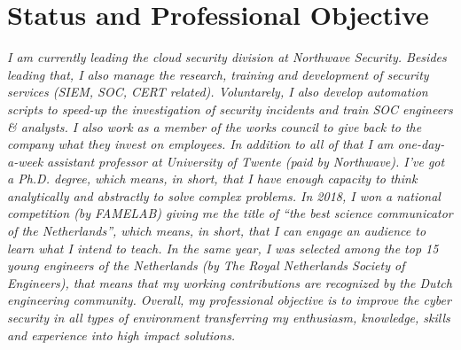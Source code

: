 \documentclass[print]{styles/friggeri-cv-mac} %
\begin{document}
\section{Status and Professional Objective}\vspace{-10pt}
\noindent\setlength\parindent{12pt}\textit{
	I am currently leading the cloud security division at Northwave Security. Besides leading that, I also manage the research, training and development of security services (SIEM, SOC, CERT related). Voluntarely, I also develop automation scripts to speed-up the investigation of security incidents and train SOC engineers \& analysts. I also work as a member of the works council to give back to the company what they invest on employees.
	In addition to all of that I am one-day-a-week assistant professor at University of Twente (paid by Northwave). 
	I've got a Ph.D. degree, which means, in short, that I have enough capacity to think analytically and abstractly to solve complex problems. 
	In 2018, I won a national competition (by FAMELAB) giving me the title of ``the best science communicator of 
	the Netherlands'', which means, in short, that I can engage an audience to learn what I intend to teach.
	In the same year, I was selected among the top 15 young engineers of the Netherlands (by The Royal Netherlands Society of Engineers), that means that my working contributions are recognized by the Dutch engineering community.
	Overall, my professional objective is to improve the cyber security in all types of environment transferring my enthusiasm, knowledge, skills and experience into high impact solutions. 
}



\setlength\parindent{0pt}
\end{document}
